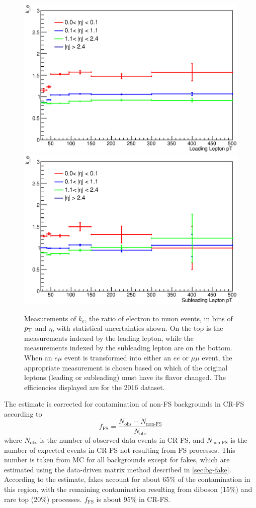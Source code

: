 \begin{centering}
\begin{figure}[!hbt]
\myfloatalign
\includegraphics[width=.85\linewidth]{figures/fs/data_efficiencies_2j_Z_lep0.eps}
\includegraphics[width=.85\linewidth]{figures/fs/data_efficiencies_2j_Z_lep1.eps}
\caption{Measurements of $k_e$, the ratio of electron to muon events, in bins of $p_{\text{T}}$ and $\eta$, with statistical uncertainties shown. On the top is the measurements indexed by the leading lepton, while the measurements indexed by the subleading lepton are on the bottom. When an $e\mu$ event is transformed into either an $ee$ or $\mu\mu$ event, the appropriate measurement is chosen based on which of the original leptons (leading or subleading) must have its flavor changed. The efficiencies displayed are for the 2016 dataset.}
\label{fig:fs_k}
\end{figure}
\end{centering}

The estimate is corrected for contamination of non-\ac{FS} backgrounds in CR-FS according to
%
\begin{equation}
f_{\mathrm{FS}} = \frac{N_\text{obs} - N_\text{non-FS}}{N_\text{obs}}
\end{equation}
%
where $N_\text{obs}$ is the number of observed data events in CR-FS, and $N_\text{non-FS}$ is the number of expected events in CR-FS not resulting from \ac{FS} processes. This number is taken from \ac{MC} for all backgrounds except for fakes, which are estimated using the data-driven matrix method described in \autoref{sec:bg-fake}. According to the estimate, fakes account for about 65\% of the contamination in this region, with the remaining contamination resulting from diboson (15\%) and rare top (20\%) processes. $f_{\mathrm{FS}}$ is about 95\% in CR-FS. 

